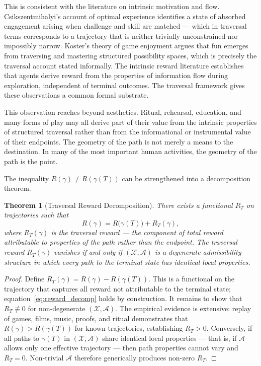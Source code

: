 \documentclass[12pt, a4paper]{article}
\theoremstyle{plain}
\newtheorem{theorem}{Theorem}[section]
\theoremstyle{definition}
\theoremstyle{remark}
\newcommand{\X}{\mathcal{X}}
\newcommand{\A}{\mathcal{A}}
\newcommand{\traj}{\gamma}
\newcommand{\reward}{R}
\begin{document}
This is consistent with the literature on intrinsic
motivation and flow. Csikszentmihalyi's account of optimal
experience \cite{csikszentmihalyi1990} identifies a state
of absorbed engagement arising when challenge and skill are
matched --- which in traversal terms corresponds to a
trajectory that is neither trivially unconstrained nor
impossibly narrow. Koster's theory of game enjoyment
\cite{koster2013} argues that fun emerges from traversing
and mastering structured possibility spaces, which is
precisely the traversal account stated informally. The
intrinsic reward literature \cite{berlyne1960,
schmidhuber1991, oudeyer2007} establishes that agents
derive reward from the properties of information flow
during exploration, independent of terminal outcomes.
The traversal framework gives these observations a common
formal substrate.

This observation reaches beyond aesthetics. Ritual, rehearsal,
education, and many forms of play may all derive part of
their value from the intrinsic properties of structured
traversal rather than from the informational or instrumental
value of their endpoints. The geometry of the path is not
merely a means to the destination. In many of the most
important human activities, the geometry of the path is the
point.

The inequality $\reward(\traj) \neq \reward(\traj(T))$ can
be strengthened into a decomposition theorem.

\begin{theorem}[Traversal Reward Decomposition]
\label{thm:reward_decomposition}
  There exists a functional $\reward_T$ on trajectories
  such that
  \begin{equation}
    \reward(\traj)
    = \reward\bigl(\traj(T)\bigr) + \reward_T(\traj),
    \label{eq:reward_decomp}
  \end{equation}
  where $\reward_T(\traj)$ is the \emph{traversal reward}
  --- the component of total reward attributable to
  properties of the path rather than the endpoint.
  The traversal reward $\reward_T(\traj)$ vanishes if and
  only if $(\X, \A)$ is a degenerate admissibility
  structure in which every path to the terminal state has
  identical local properties.
\end{theorem}

\begin{proof}
  Define $\reward_T(\traj) = \reward(\traj) -
  \reward(\traj(T))$. This is a functional on the
  trajectory that captures all reward not attributable to
  the terminal state; equation~\eqref{eq:reward_decomp}
  holds by construction. It remains to show that
  $\reward_T \not\equiv 0$ for non-degenerate $(\X, \A)$.
  The empirical evidence is extensive: replay of games,
  films, music, proofs, and ritual demonstrates that
  $\reward(\traj) > \reward(\traj(T))$ for known
  trajectories, establishing $\reward_T > 0$.
  Conversely, if all paths to $\traj(T)$ in $(\X, \A)$
  share identical local properties --- that is, if $\A$
  allows only one effective trajectory --- then path
  properties cannot vary and $\reward_T = 0$. Non-trivial
  $\A$ therefore generically produces non-zero $\reward_T$.
\end{proof}
\end{document}
